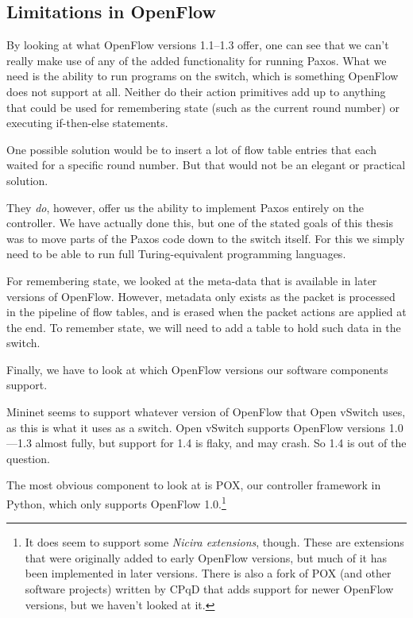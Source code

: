 
\subsection{Limitations in OpenFlow}

By looking at what OpenFlow versions 1.1--1.3 offer,
one can see that we can't really make use of any of the added functionality
for running Paxos.  What we need is the ability to run programs on the
switch, which is something OpenFlow does not support at all.  Neither do
their action primitives add up to anything that could be used for
remembering state (such as the current round number) or executing
if-then-else statements.

One possible solution would be to insert a lot of flow table entries that
each waited for a specific round number.  But that would not be an elegant
or practical solution.

They \textit{do}, however, offer us the ability to implement Paxos entirely
on the controller.  We have actually done this, but one of the stated goals
of this thesis was to move parts of the Paxos code down to the switch
itself.  For this we simply need to be able to run full Turing-equivalent
programming languages.

For remembering state, we looked at the meta-data
that is available in later versions of OpenFlow.  However, metadata only
exists as the packet is processed in the pipeline of flow tables, and is
erased when the packet actions are applied at the end.  To remember state,
we will need to add a table to hold such data in the switch.

Finally, we have to look at which OpenFlow versions our software components
support.

Mininet seems to support whatever version of OpenFlow that Open vSwitch uses,
as this is what it uses as a switch.  Open vSwitch
supports OpenFlow versions 1.0---1.3
almost fully, but support for 1.4 is flaky, and may crash.  So 1.4 is out of the question.

The most obvious component to look at is POX, our controller framework in
Python, which only supports OpenFlow 1.0.\footnote{It does seem to support
some \textit{Nicira extensions}, though.  These are extensions that were originally added to
early OpenFlow versions, but much of it has been implemented in later
versions.  There is also a fork of POX (and other software projects) written
by CPqD that adds support for newer OpenFlow versions, but we haven't looked
at it.}

